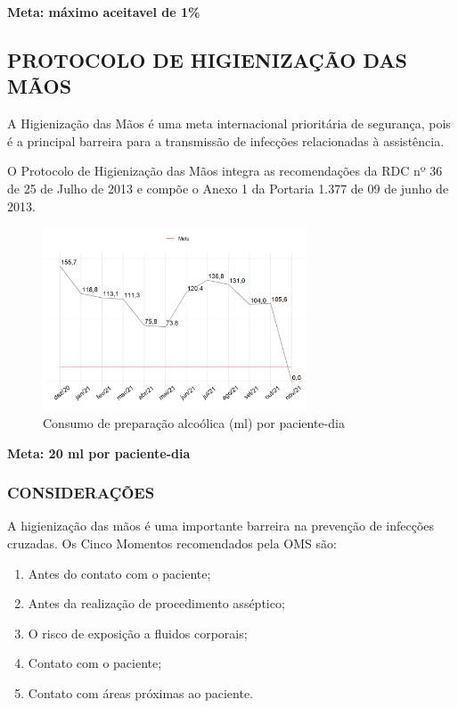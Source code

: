 \documentclass[
  a4paper]{article}
\begin{document}
\begin{center}
 \textbf{Meta: máximo aceitavel de 1\%}
\end{center}

\newpage

\subsection{PROTOCOLO DE HIGIENIZAÇÃO DAS MÃOS}

\hspace{1cm} A Higienização das Mãos é uma meta internacional
prioritária de segurança, pois é a principal barreira para a transmissão
de infecções relacionadas à assistência.

\hspace{1cm} O Protocolo de Higienização das Mãos integra as
recomendações da RDC nº 36 de 25 de Julho de 2013 e compõe o Anexo 1 da
Portaria 1.377 de 09 de junho de 2013.

\begin{figure}[H]
\caption{Consumo de preparação alcoólica (ml) por paciente-dia}
\includegraphics[width=0.7\textwidth]{Imagens/higienizacao_pediatria.png}
\end{figure}

\begin{center}
 \textbf{Meta: 20 ml por paciente-dia}
\end{center}

\subsubsection{CONSIDERAÇÕES}

A higienização das mãos é uma importante barreira na prevenção de
infecções cruzadas. Os Cinco Momentos recomendados pela OMS são:

\begin{enumerate}
    \item Antes do contato com o paciente;
    \item Antes da realização de procedimento asséptico;
    \item O risco de exposição a fluidos corporais;
    \item Contato com o paciente;
    \item Contato com áreas próximas ao paciente.
\end{enumerate}
\end{document}
